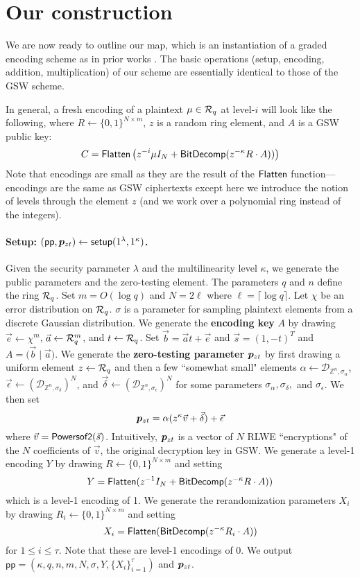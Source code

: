 \section{Our construction}

We are now ready to outline our map, which is an instantiation of a graded encoding scheme as in prior works \cite{clt, ggh13a, clt15}.  The basic operations (setup, encoding, addition, multiplication) of our scheme are essentially identical to those of the GSW scheme.

In general, a fresh encoding of a plaintext $\mu \in \mathcal{R}_q$ at level-$i$ will look like the following, where $R \leftarrow \{0,1\}^{N\times m}$, $z$ is a random ring element, and $A$ is a GSW public key:
$$C = \mathsf{Flatten}\left(z^{-i}\mu I_{N} + \mathsf{BitDecomp}(z^{-\kappa} R\cdot A))\right)$$
Note that encodings are small as they are the result of the $\mathsf{Flatten}$ function---encodings are the same as GSW ciphertexts except here we introduce the notion of levels through the element $z$ (and we work over a polynomial ring instead of the integers).

\paragraph{Setup: $(\mathsf{pp},\bm{p}_{zt}) \leftarrow \mathsf{setup}(1^\lambda, 1^\kappa)$.}  Given the security parameter $\lambda$ and the multilinearity level $\kappa$, we generate the public parameters and the zero-testing element.  The parameters $q$ and $n$ define the ring $\mathcal{R}_q$.  Set $m = O(\log q)$ and $N = 2\ell$ where $\ell = \lceil \log q \rceil$.  Let $\chi$ be an error distribution on $\mathcal{R}_q$.  $\sigma$ is a parameter for sampling plaintext elements from a discrete Gaussian distribution.  We generate the {\bf encoding key} $A$ by drawing $\vec{e} \leftarrow \chi^m$, $\vec{a} \leftarrow \mathcal{R}_q^m$, and $t \leftarrow \mathcal{R}_q$.  Set $\vec{b} = \vec{a}t + \vec{e}$ and $\vec{s} = (1, -t)^T$ and $A = \big(\vec{b} \; \big| \; \vec{a}\big)$.  We generate the {\bf zero-testing parameter} $\bm{p}_{zt}$ by first drawing a uniform element $z \leftarrow \mathcal{R}_q$ and then a few ``somewhat small" elements $\alpha \leftarrow \mathcal{D}_{\mathbb{Z}^n, \sigma_\alpha}$, $\vec{\epsilon} \leftarrow (\mathcal{D}_{\mathbb{Z}^n, \sigma_\delta})^N$, and $\vec{\delta} \leftarrow (\mathcal{D}_{\mathbb{Z}^n, \sigma_\epsilon})^N$ for some parameters $\sigma_\alpha, \sigma_\delta,$ and $\sigma_\epsilon$.  We then set $$\bm{p}_{zt} = \alpha(z^\kappa\vec{v} + \vec{\delta}) + \vec{\epsilon}$$ where $\vec{v} =  \mathsf{Powersof2}(\vec{s})$.  Intuitively, $\bm{p}_{zt}$ is a vector of $N$ RLWE ``encryptions" of the $N$ coefficients of $\vec{v}$, the original decryption key in GSW.  We generate a level-1 encoding $Y$ by drawing $R \leftarrow \{0,1\}^{N\times m}$ and setting $$Y = \mathsf{Flatten}(z^{-1}I_N + \mathsf{BitDecomp}(z^{-\kappa}R\cdot A))$$  which is a level-1 encoding of 1. We generate the rerandomization parameters $X_i$ by drawing $R_i \leftarrow \{0,1\}^{N \times m}$ and setting $$X_i = \mathsf{Flatten}(\mathsf{BitDecomp}(z^{-\kappa}R_i\cdot A))$$ for $1 \leq i \leq \tau$.  Note that these are level-1 encodings of 0. We output $\mathsf{pp} = (\kappa, q,n,m,N,\sigma, Y, \{X_i\}_{i=1}^\tau)$ and $\bm{p}_{zt}$.

